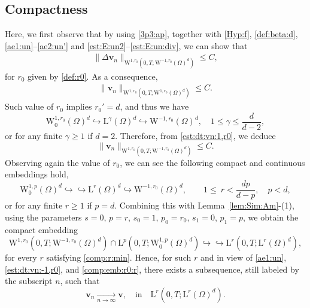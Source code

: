 \documentclass[12pt,reqno]{amsart}
\numberwithin{equation}{section}
\theoremstyle{definition}
\def\W{\mathrm{W}}
\def\L{\mathrm{L}}
\def\vv{\boldsymbol{v}}
\begin{document}
{\subsection{Compactness}\label{CP}
{Here, we first observe that by using \eqref{3p3:ap}, together with \eqref{Hyp:f}, \eqref{def:beta:d}, \eqref{ae1:un}--\eqref{ae2:un'} and \eqref{est:E:un2}--\eqref{est:E:un:div}, we can show that
\begin{align*}
	\big\|\Delta\vv_n\big\|_{\W^{1,r_0}(0,T;\W^{-1,r_0}(\Omega)^d)} \leq C,
\end{align*}
for $r_0$ given by \eqref{def:r0}.
As a consequence,
\begin{align}\label{est:dt:vn:1,r0}
	\big\|\vv_n\big\|_{\W^{1,r_0}(0,T;\W^{1,r_0}(\Omega)^d)} \leq C.
\end{align}
Such value of $r_0$ implies $r_0' = d$, and thus we have
{
\begin{equation*}
\W_0^{1,r_0}(\Omega)^d\hookrightarrow\L^{\gamma}(\Omega)^d\hookrightarrow
\W^{-1,r_0}(\Omega)^d,\quad 1\leq\gamma\leq\frac{d}{d-2},
\end{equation*}
or for any finite $\gamma\geq 1$ if $d=2$.}
Therefore, from \eqref{est:dt:vn:1,r0}, we deduce
\begin{equation}\label{est:dt:vn:-1,r0}
\big\|\vv_n\big\|_{\W^{1,r_0}(0,T;\W^{-1,r_0}(\Omega)^d)}
\leq C.
\end{equation}
Observing again the value of $r_0$, we can see the following compact and continuous embeddings hold,
\begin{equation}\label{comp:r:min}
\W_0^{1,p}(\Omega)^d\hookrightarrow\hookrightarrow \L^{r}(\Omega)^d \hookrightarrow \W^{-1,r_0}(\Omega)^d,
\qquad 1\leq\ r < \frac{dp}{d-p},\quad p<d,
\end{equation}
or for any finite $r\geq 1$ if $p=d$.
Combining this with Lemma~\ref{lem:Sim:Am}-(1),
using the parameters $s=0$, $p=r$, $s_0=1$, $p_0=r_0$, $s_1=0$, $p_1=p$,
we obtain the compact embedding
\begin{equation}\label{comp:emb:r0:r}
\W^{1,r_0}(0,T;\W^{-1,r_0}(\Omega)^d)\cap
\L^p(0,T;\W_0^{1,p}(\Omega)^d)
\hookrightarrow\hookrightarrow
\L^r(0,T;\L^r(\Omega)^d),
\end{equation}
for every $r$ satisfying \eqref{comp:r:min}.
Hence, for such $r$ and in view of \eqref{ae1:un}, \eqref{est:dt:vn:-1,r0}, and \eqref{comp:emb:r0:r}, there exists a subsequence, still labeled by the subscript $n$, such that
\begin{equation}
\label{5.12:a.e-:n}
\vv_n \xrightarrow[n\to\infty]{} \vv, \quad \text{in}\quad \L^r(0,T;\L^r(\Omega)^d).

\end{equation}}}
\end{document}
